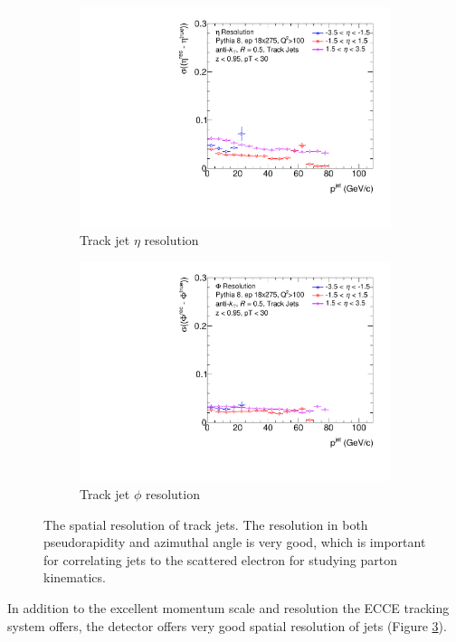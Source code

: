 \begin{figure}[H]
    \centering
    \begin{subfigure}{0.4\textwidth}
        \centering
        \includegraphics[width=\linewidth]{figs/Final_Plots/EtaReso_track_grouped.pdf}
        \caption{Track jet $\eta$ resolution}
        \label{fig:track_eta_resolution}
    \end{subfigure}
    \hfill
    \begin{subfigure}{0.4\textwidth}
        \centering
        \includegraphics[width=\linewidth]{figs/Final_Plots/PhiReso_track_grouped.pdf}
        \caption{Track jet $\phi$ resolution}
        \label{fig:track_phi_resolution}
    \end{subfigure}
    \caption{The spatial resolution of track jets.  The resolution in both pseudorapidity and azimuthal angle is very good, which is important for correlating jets to the scattered electron for studying parton kinematics.  }
    \label{fig:track_spatial_reso_scale}
\end{figure}

In addition to the excellent momentum scale and resolution the ECCE tracking system offers, the detector offers very good spatial resolution of jets (Figure \ref{fig:track_spatial_reso_scale}).
